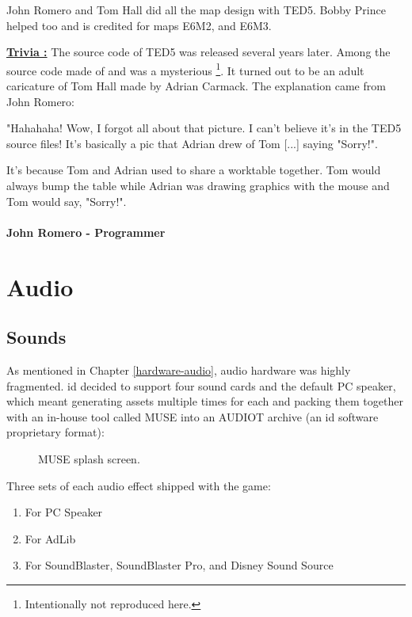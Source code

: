 \documentclass[book.tex]{subfiles}
\begin{document}
\par
John Romero and Tom Hall did all the map design with TED5. Bobby Prince helped too and is credited for maps E6M2, and E6M3.\\
\par
 \textbf{\underline{Trivia :}} The source code of TED5 was released several years later. Among the source code made of  and  was a mysterious \footnote{Intentionally not reproduced here.}. It turned out to be an adult caricature of Tom Hall made by Adrian Carmack. The explanation came from John Romero:\\%
\par
 \begin{fancyquotes}
   "Hahahaha! Wow, I forgot all about that picture. I can't believe it's 
in the TED5 source files! It's basically a pic that Adrian drew of Tom 
[...] saying "Sorry!".\\
\par 
It's because Tom and Adrian used to share a worktable together. Tom 
would always bump the table while Adrian was drawing graphics with the 
mouse and Tom would say, "Sorry!".\\
   \\
\textbf{John Romero - Programmer}
 \end{fancyquotes}











\section{Audio}

\subsection{Sounds}
As mentioned in Chapter \ref{hardware-audio}, audio hardware was highly fragmented. id decided to support four sound cards and the default PC speaker, which meant generating assets multiple times for each and packing them together with an in-house tool called MUSE into an AUDIOT archive (an id software proprietary format):\\
\begin{figure}[H]
\centering

  \caption{MUSE splash screen.}
 \end{figure}
 \par
 Three sets of each audio effect shipped with the game:
\begin{enumerate}
\item For PC Speaker
\item For AdLib
\item For SoundBlaster, SoundBlaster Pro, and Disney Sound Source
\end{enumerate}
\end{document}
